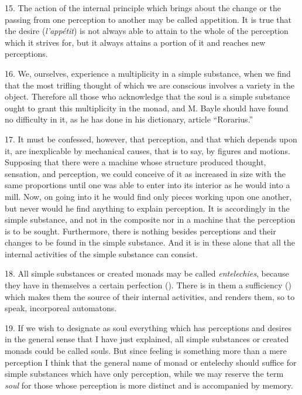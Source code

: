 15. The action of the internal principle which brings about the change
or the passing from one perception to another may be called
appetition. It is true that the desire (\textit{l'app\'etit}) is not
always able to attain to  the whole of the perception which
it strives for, but it always attains a portion of it and reaches new
perceptions.

16. We, ourselves, experience a multiplicity in a simple substance,
when we find that the most trifling thought of which we are conscious
involves a variety in the object. Therefore all those who acknowledge
that the soul is a simple substance ought to grant this multiplicity
in the monad, and M. Bayle should have found no difficulty in it, as
he has done in his dictionary, article ``Rorarius.''

17. It must be confessed, however, that perception, and that which
depends upon it, are inexplicable by mechanical causes, that is to
say, by figures and motions. Supposing that there were a machine whose
structure produced thought, sensation, and perception, we could
conceive of it as increased in size with the same proportions until
one was able to enter into its interior as he would into a mill. Now,
on going into it he would find only pieces working upon one another,
but never would he find anything to explain perception. It is
accordingly in the simple substance, and not in the composite nor in a
machine that the perception is to be sought. Furthermore, there is
nothing besides perceptions and their changes to be found in the
simple substance. And it is in these alone that all the internal
activities of the simple substance can consist.

18. All simple substances or created monads may be called
\textit{entelechies}, because they have in themselves a certain
perfection (). There is in them a sufficiency
() which makes them the source of their internal
activities, and renders them, so to speak, incorporeal automatons.

19. If we wish to designate as soul everything which has
perceptions and desires in the general sense that I have just
explained, all simple substances or created monads could be called
souls. But since feeling is something more than a mere perception I
think that the general name of monad or entelechy should suffice for
simple substances which have only perception, while we may reserve the
term \textit{soul} for those whose perception is more distinct and is
accompanied by memory.

